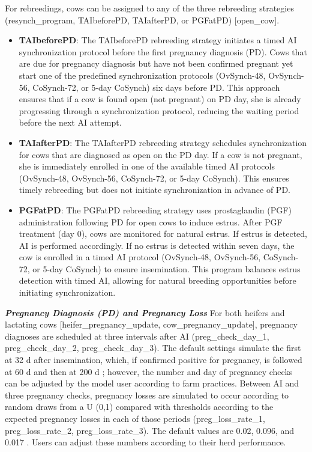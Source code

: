 \documentclass{article}
\begin{document}
\begin{refsection}
\begin{tcolorbox}[colback=white, colframe=black, title=Important Note]
For rebreedings, cows can be assigned to any of the three rebreeding strategies (resynch\_program, TAIbeforePD, TAIafterPD, or PGFatPD) [open\_cow].
\end{tcolorbox}


    \begin{itemize}
        \item \textbf{TAIbeforePD}: The TAIbeforePD rebreeding strategy initiates a timed AI synchronization protocol before the first pregnancy diagnosis (PD). Cows that are due for pregnancy diagnosis but have not been confirmed pregnant yet start one of the predefined synchronization protocols (OvSynch-48, OvSynch-56, CoSynch-72, or 5-day CoSynch) six days before PD. This approach ensures that if a cow is found open (not pregnant) on PD day, she is already progressing through a synchronization protocol, reducing the waiting period before the next AI attempt.
        \item \textbf{TAIafterPD}: The TAIafterPD rebreeding strategy schedules synchronization for cows that are diagnosed as open on the PD day. If a cow is not pregnant, she is immediately enrolled in one of the available timed AI protocols (OvSynch-48, OvSynch-56, CoSynch-72, or 5-day CoSynch). This ensures timely rebreeding but does not initiate synchronization in advance of PD.
        \item \textbf{PGFatPD}: The PGFatPD rebreeding strategy uses prostaglandin (PGF) administration following PD for open cows to induce estrus. After PGF treatment (day 0), cows are monitored for natural estrus. If estrus is detected, AI is performed accordingly. If no estrus is detected within seven days, the cow is enrolled in a timed AI protocol (OvSynch-48, OvSynch-56, CoSynch-72, or 5-day CoSynch) to ensure insemination. This program balances estrus detection with timed AI, allowing for natural breeding opportunities before initiating synchronization.
    \end{itemize}
    
    \vspace{1cm}
    \textbf{\textit{Pregnancy Diagnosis (PD) and Pregnancy Loss}} For both heifers and lactating cows [heifer\_pregnancy\_update, cow\_pregnancy\_update], pregnancy diagnoses are scheduled at three intervals after AI (preg\_check\_day\_1, preg\_check\_day\_2, preg\_check\_day\_3). The default settings simulate the first at 32 d after insemination, which, if confirmed positive for pregnancy, is followed at 60 d and then at 200 d \parencite{wiltbank2016}; however, the number and day of pregnancy checks can be adjusted by the model user according to farm practices. Between AI and three pregnancy checks, pregnancy losses are simulated to occur according to random draws from a U (0,1) compared with thresholds according to the expected pregnancy losses in each of those periods (preg\_loss\_rate\_1, preg\_loss\_rate\_2, preg\_loss\_rate\_3). The default values are 0.02, 0.096, and 0.017 \parencite{wiltbank2016}. Users can adjust these numbers according to their herd performance.  



\end{refsection}
\end{document}
